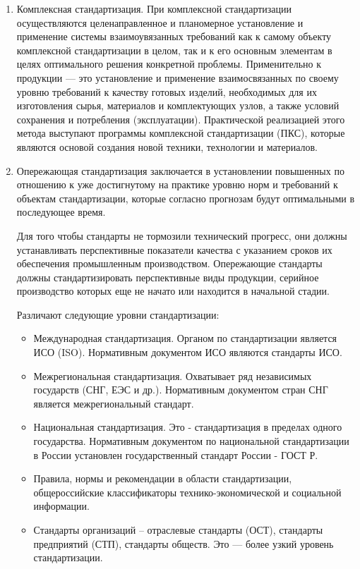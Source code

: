 \begin{enumerate}
\item Комплексная стандартизация. При комплексной стандартизации осуществляются целенаправленное и планомерное установление и применение системы взаимоувязанных требований как к самому объекту комплексной стандартизации в целом, так и к его основным элементам в целях оптимального решения конкретной проблемы. Применительно к продукции --- это установление и применение взаимосвязанных по своему уровню требований к качеству готовых изделий, необходимых для их изготовления сырья, материалов и комплектующих узлов, а также условий сохранения и потребления (эксплуатации). Практической реализацией этого метода выступают программы комплексной стандартизации (ПКС), которые являются основой создания новой техники, технологии и материалов.

\item Опережающая стандартизация заключается в установлении повышенных по отношению к уже достигнутому на практике уровню норм и требований к объектам стандартизации, которые согласно прогнозам будут оптимальными в последующее время.

Для того чтобы стандарты не тормозили технический прогресс, они должны устанавливать перспективные показатели качества с указанием сроков их обеспечения промышленным производством. Опережающие стандарты должны стандартизировать перспективные виды продукции, серийное производство которых еще не начато или находится в начальной стадии.

Различают следующие уровни стандартизации:
\begin{itemize}
\item Международная стандартизация. Органом по стандартизации является ИСО (ISO). Нормативным документом ИСО являются стандарты ИСО.
\item Межрегиональная стандартизация. Охватывает ряд независимых государств (СНГ, ЕЭС и др.). Нормативным документом стран СНГ является межрегиональный стандарт.
\item Национальная стандартизация. Это - стандартизация в пределах одного государства. Нормативным документом по национальной стандартизации в России установлен государственный стандарт России - ГОСТ Р.
\item Правила, нормы и рекомендации в области стандартизации, общероссийские классификаторы технико-экономической и социальной информации. 
\item Стандарты организаций -- отраслевые стандарты (ОСТ), стандарты предприятий (СТП), стандарты обществ. Это --- более узкий уровень стандартизации.
\end{itemize}

\end{enumerate}

